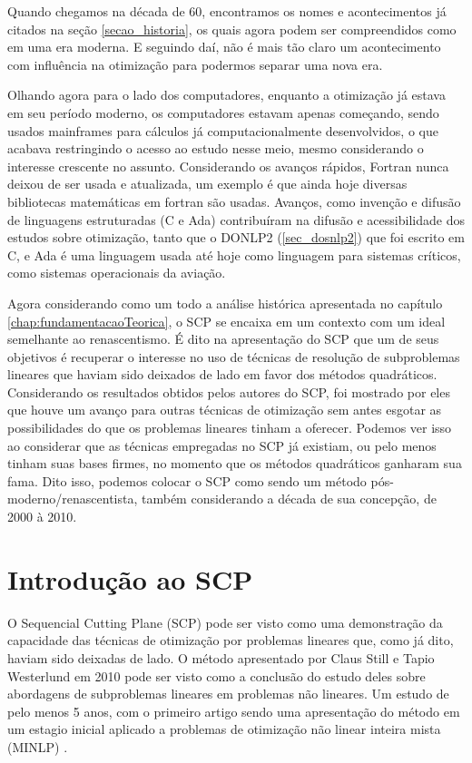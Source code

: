 Quando chegamos na década de 60, encontramos os nomes e acontecimentos já citados na seção
\ref{secao_historia}, os quais agora podem ser compreendidos como em uma era moderna. E
seguindo daí, não é mais tão claro um acontecimento com influência na otimização para
podermos separar uma nova era.

Olhando agora para o lado dos computadores, enquanto a otimização já estava em seu
período moderno, os computadores estavam apenas começando, sendo usados mainframes
para cálculos já computacionalmente desenvolvidos, o que acabava restringindo o
acesso ao estudo nesse meio, mesmo considerando o interesse crescente no assunto.
Considerando os avanços rápidos, Fortran nunca deixou de ser usada e atualizada,
um exemplo é que ainda hoje diversas bibliotecas matemáticas em fortran são usadas.
Avanços, como invenção e difusão de linguagens estruturadas (C e Ada) contribuíram
na difusão e acessibilidade dos estudos sobre otimização, tanto que o DONLP2
(\ref{sec_dosnlp2}) que foi escrito em C, e Ada é uma linguagem usada até hoje
como linguagem para sistemas críticos, como sistemas operacionais da aviação.

Agora considerando como um todo a análise histórica apresentada no capítulo
\ref{chap:fundamentacaoTeorica}, o SCP se encaixa em um contexto com um ideal
semelhante ao renascentismo. É dito na apresentação do SCP que um de seus objetivos
é recuperar o interesse no uso de técnicas de resolução de subproblemas lineares
que haviam sido deixados de lado em favor dos métodos quadráticos. Considerando
os resultados obtidos pelos autores do SCP, foi mostrado por eles que houve
um avanço para outras técnicas de otimização sem antes esgotar as possibilidades
do que os problemas lineares tinham a oferecer. Podemos ver isso ao considerar
que as técnicas empregadas no SCP já existiam, ou pelo menos tinham suas bases
firmes, no momento que os métodos quadráticos ganharam sua fama. Dito isso, podemos
colocar o SCP como sendo um método pós-moderno/renascentista, também considerando
a década de sua concepção, de 2000 à 2010.







\section{Introdução ao SCP}
O Sequencial Cutting Plane (SCP) \cite{Still2010} pode ser visto como uma demonstração da
capacidade das técnicas de otimização por problemas lineares que, como já dito, haviam
sido deixadas de lado. O método apresentado por Claus Still e Tapio Westerlund em 2010
pode ser visto como a conclusão do estudo deles sobre abordagens de subproblemas lineares
em problemas não lineares. Um estudo de pelo menos 5 anos, com o primeiro artigo sendo
uma apresentação do método em um estagio inicial aplicado a problemas de otimização
não linear inteira mista (MINLP) \cite{Still_2005}.

